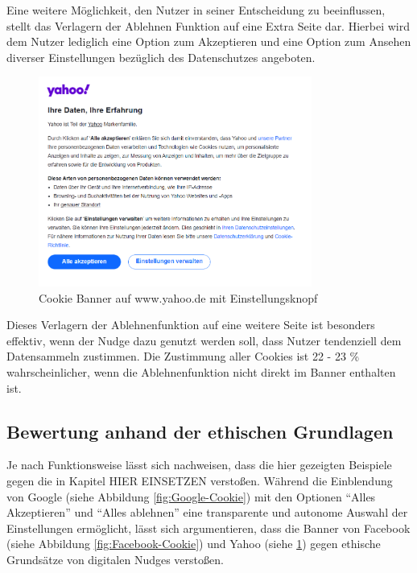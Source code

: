 Eine weitere Möglichkeit, den Nutzer in seiner Entscheidung zu beeinflussen, stellt das Verlagern der Ablehnen Funktion auf eine Extra Seite dar. Hierbei wird dem Nutzer lediglich eine Option zum Akzeptieren und eine Option zum Ansehen diverser Einstellungen bezüglich des Datenschutzes angeboten.

\begin{figure}[ht]
    \centering
    \includegraphics[width=0.8\textwidth]{Bilder/Yahoo_Banner.png}
    \caption{Cookie Banner auf www.yahoo.de mit Einstellungsknopf}
    \label{fig:Yahoo-Cookie}
\end{figure}

Dieses Verlagern der Ablehnenfunktion auf eine weitere Seite ist besonders effektiv, wenn der Nudge dazu genutzt werden soll, dass Nutzer tendenziell dem Datensammeln zustimmen. Die Zustimmung aller Cookies ist 22 - 23 \% wahrscheinlicher, wenn die Ablehnenfunktion nicht direkt im Banner enthalten ist. 

\subsection{Bewertung anhand der ethischen Grundlagen}

Je nach Funktionsweise lässt sich nachweisen, dass die hier gezeigten Beispiele gegen die in Kapitel HIER EINSETZEN verstoßen.
Während die Einblendung von Google (siehe Abbildung \ref{fig:Google-Cookie}) mit den Optionen ``Alles Akzeptieren'' und ``Alles ablehnen'' eine transparente und autonome Auswahl der Einstellungen ermöglicht, lässt sich argumentieren, dass die Banner von Facebook (siehe Abbildung \ref{fig:Facebook-Cookie}) und Yahoo (siehe \ref{fig:Yahoo-Cookie}) gegen ethische Grundsätze von digitalen Nudges verstoßen.

